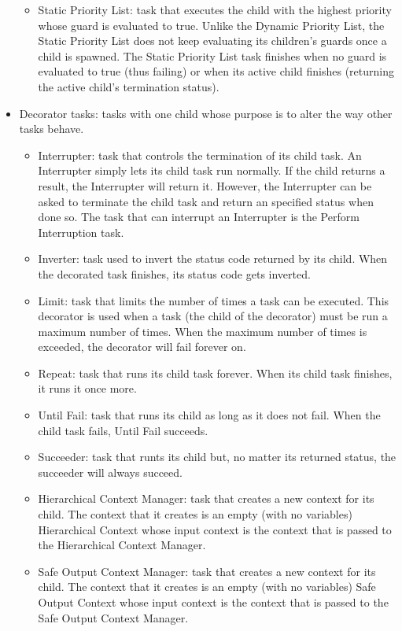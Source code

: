 \documentclass[a4paper]{article}
\begin{document}
\begin{itemize}
\begin{itemize}
    \item Static Priority List: task that executes the child with the highest priority whose guard is evaluated to true. Unlike the Dynamic Priority List, the Static Priority List does not keep evaluating its children's guards once a child is spawned. The Static Priority List task finishes when no guard is evaluated to true (thus failing) or when its active child finishes (returning the active child's termination status).
  \end{itemize}
  \item Decorator tasks: tasks with one child whose purpose is to alter the way other tasks behave.
  \begin{itemize}
    \item Interrupter: task that controls the termination of its child task. An Interrupter simply lets its child task run normally. If the child returns a result, the Interrupter will return it. However, the Interrupter can be asked to terminate the child task and return an specified status when done so. The task that can interrupt an Interrupter is the Perform Interruption task.
    \item Inverter: task used to invert the status code returned by its child. When the decorated task finishes, its status code gets inverted.
    \item Limit: task that limits the number of times a task can be executed. This decorator is used when a task (the child of the decorator) must be run a maximum number of times. When the maximum number of times is exceeded, the decorator will fail forever on.
    \item Repeat: task that runs its child task forever. When its child task finishes, it runs it once more.
    \item Until Fail: task that runs its child as long as it does not fail. When the child task fails, Until Fail succeeds.
    \item Succeeder: task that runts its child but, no matter its returned status, the succeeder will always succeed.
    \item Hierarchical Context Manager: task that creates a new context for its child. The context that it creates is an empty (with no variables) Hierarchical Context whose input context is the context that is passed to the Hierarchical Context Manager.
    \item Safe Output Context Manager: task that creates a new context for its child. The context that it creates is an empty (with no variables) Safe Output Context whose input context is the context that is passed to the Safe Output Context Manager.

\end{itemize}
\end{itemize}
\end{document}

